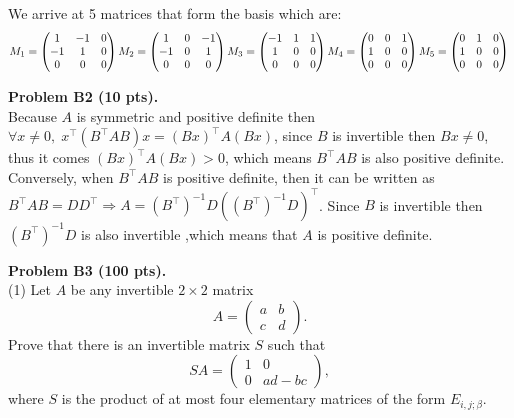 \documentclass[12pt]{article}
\begin{document}
We arrive at 5 matrices that form the basis which are:
$$M_1 = \begin{pmatrix} 1 & -1 & 0 \\ -1 & 1 & 0\\ 0 & 0 & 0 \end{pmatrix} \\
M_2 = \begin{pmatrix} 1 & 0 & -1 \\ -1 & 0 & 1\\ 0 & 0 & 0 \end{pmatrix} \\
M_3 = \begin{pmatrix} -1 & 1 & 1 \\ 1 & 0 & 0\\ 0 & 0 & 0 \end{pmatrix}\\
M_4 = \begin{pmatrix} 0 & 0 & 1 \\ 1 & 0 & 0\\ 0 & 0 & 0 \end{pmatrix}\\
M_5 = \begin{pmatrix} 0 & 1 & 0 \\ 1 & 0 & 0\\ 0 & 0 & 0 \end{pmatrix}\\
$$


\vspace {0.25cm}\noindent
{\bf Problem B2 (10 pts).} \\
Because $A$ is symmetric and positive definite then $\forall x \neq 0, \; x^\top (B^\top A B) x = (Bx)^\top A (Bx)$, since $B$ is invertible then $Bx \neq 0$, thus it comes $(Bx)^\top A (Bx) > 0$, which means $B^\top A B$ is also positive definite.\\
Conversely, when $B^\top A B$ is positive definite, then it can be written as $B^\top A B = D D^\top \Rightarrow A = (B^\top)^{-1} D ((B^\top)^{-1} D )^\top$. Since $B$ is invertible then $ (B^\top)^{-1} D$ is also invertible  ,which means that $A$ is positive definite.

\vspace {0.25cm}\noindent
{\bf Problem B3 (100 pts).}\\
(1)
Let $A$ be any invertible $2\times 2$ matrix
\[
A = 
\begin{pmatrix}
a & b \\
c & d
\end{pmatrix}.
\]
Prove that there is an invertible matrix $S$ such that
\[
SA = 
\begin{pmatrix}
1 & 0 \\
0 & ad - bc
\end{pmatrix},
\]
where $S$ is the product of at most four elementary matrices
of the form $E_{i, j; \beta}$.
\end{document}
